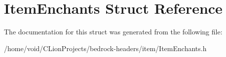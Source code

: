 \hypertarget{struct_item_enchants}{}\section{Item\+Enchants Struct Reference}
\label{struct_item_enchants}


The documentation for this struct was generated from the following file\+:\begin{DoxyCompactItemize}
\item 
/home/void/\+C\+Lion\+Projects/bedrock-\/headers/item/Item\+Enchants.\+h\end{DoxyCompactItemize}
